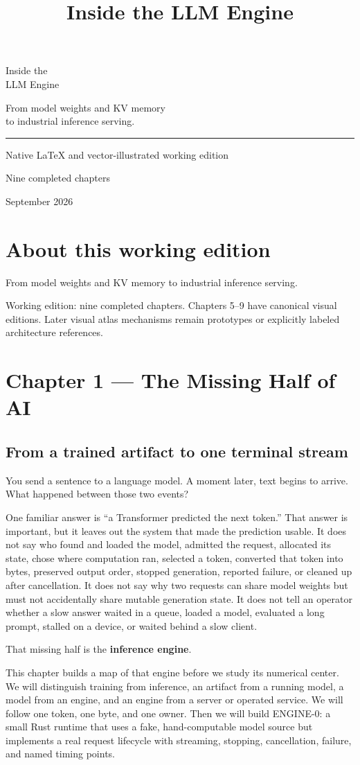 \documentclass[
  10pt,
]{article}
\title{Inside the LLM Engine}
\author{}
\date{}
\renewcommand{\maketitle}{\hypersetup{pageanchor=false}\begin{titlepage}\centering
\vspace*{35mm}
{\sffamily\fontsize{34}{42}\selectfont Inside the\\LLM Engine\par}
\vspace{12mm}
{\Large From model weights and KV memory\\to industrial inference serving.\par}
\vspace{18mm}\rule{.7\linewidth}{.6pt}\par\vspace{8mm}
{\sffamily Native LaTeX and vector-illustrated working edition\par}
\vfill Nine completed chapters\par September 2026
\end{titlepage}\hypersetup{pageanchor=true}}
\let\editioncontents\tableofcontents
\renewcommand{\tableofcontents}{\clearpage\editioncontents\clearpage}
\begin{document}
\maketitle

{
\setcounter{tocdepth}{2}
\tableofcontents
}
\section{About this working edition}\label{about-this-working-edition}

From model weights and KV memory to industrial inference serving.

Working edition: nine completed chapters. Chapters 5--9 have canonical
visual editions. Later visual atlas mechanisms remain prototypes or
explicitly labeled architecture references.

\clearpage

\section{Chapter 1 --- The Missing Half of
AI}\label{chapter-1-the-missing-half-of-ai}

\subsection{From a trained artifact to one terminal
stream}\label{from-a-trained-artifact-to-one-terminal-stream}

You send a sentence to a language model. A moment later, text begins to
arrive. What happened between those two events?

One familiar answer is ``a Transformer predicted the next token.'' That
answer is important, but it leaves out the system that made the
prediction usable. It does not say who found and loaded the model,
admitted the request, allocated its state, chose where computation ran,
selected a token, converted that token into bytes, preserved output
order, stopped generation, reported failure, or cleaned up after
cancellation. It does not say why two requests can share model weights
but must not accidentally share mutable generation state. It does not
tell an operator whether a slow answer waited in a queue, loaded a
model, evaluated a long prompt, stalled on a device, or waited behind a
slow client.

That missing half is the \textbf{inference engine}.

This chapter builds a map of that engine before we study its numerical
center. We will distinguish training from inference, an artifact from a
running model, a model from an engine, and an engine from a server or
operated service. We will follow one token, one byte, and one owner.
Then we will build ENGINE-0: a small Rust runtime that uses a fake,
hand-computable model source but implements a real request lifecycle
with streaming, stopping, cancellation, failure, and named timing
points.
\end{document}

